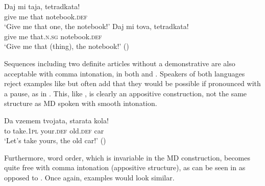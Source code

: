 \documentclass[output=paper,
colorlinks,
citecolor=brown,
newtxmath
]{langscibook}
\begin{document}
\ea
\ea \label{notebook2}
\gll Daj mi taja, tetradkata! \\
    give me that notebook.\textsc{def} \\
\glt `Give me that one, the notebook!'
\ex \label{notebook3}
\gll Daj mi tova, tetradkata! \\
    give me that.\textsc{n.sg} notebook.\textsc{def} \\
\glt `Give me that (thing), the notebook!' \hfill ()
\z
\z

\noindent Sequences including two definite articles without a demonstrative are also acceptable with comma intonation, in both  and . Speakers of both languages reject examples like  but often add that they would be possible if pronounced with a pause, as in . This, like , is clearly an appositive construction, not the same structure as MD spoken with smooth intonation.


\z
\ea \label{yours2}
\gll Da vzemem tvojata, starata kola!\\
    to take.\textsc{1pl} your.\textsc{def} old.\textsc{def} car\\
\glt `Let's take yours, the old car!' \hfill ()
\z

\noindent Furthermore, word order, which is invariable in the MD construction, becomes quite free with comma intonation (appositive structure), as can be seen in  as opposed to . Once again,  examples would look similar.
\end{document}
